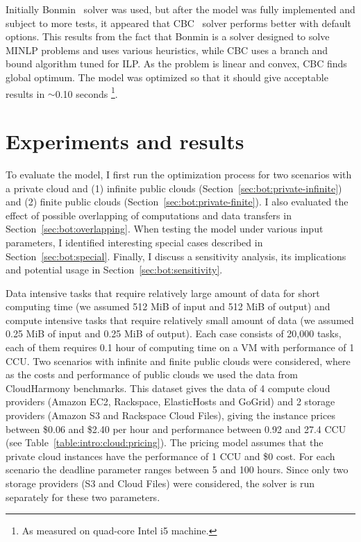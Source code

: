 {  Initially {Bonmin}~\cite{Bonami2008} solver was used, but after the model was fully implemented and subject to more tests, it appeared that CBC~\cite{cbc-solver} solver performs better with default options. This results from the fact that {Bonmin} is a solver designed to solve MINLP problems and uses various heuristics, while CBC uses a branch and bound algorithm tuned for ILP. As the problem is linear and convex, CBC finds global optimum. The model was optimized so that it should give acceptable results in $\sim$0.10 seconds \footnote{As measured on quad-core Intel i5 machine.}. 

\section{Experiments and results}
\label{sec:bot:results}
    
  To evaluate the model, I first run the optimization process for two scenarios with a private cloud and (1) infinite public clouds (Section~\ref{sec:bot:private-infinite}) and (2) finite public clouds (Section~\ref{sec:bot:private-finite}). I also evaluated the effect of possible overlapping of computations and data transfers in Section~\ref{sec:bot:overlapping}. When testing the model under various input parameters, I identified interesting special cases described in Section~\ref{sec:bot:special}. Finally, I discuss a sensitivity analysis, its implications and potential usage in Section~\ref{sec:bot:sensitivity}.
    
  Data intensive tasks that require relatively large amount of data for short computing time (we assumed 512 MiB of input and 512 MiB of output) and compute intensive tasks that require relatively small amount of data (we assumed 0.25 MiB of input and 0.25 MiB of output). Each case consists of 20,000 tasks, each of them requires 0.1 hour of computing time on a VM with performance of 1 CCU. Two scenarios with infinite and finite public clouds were considered, where as the costs and performance of public clouds we used the data from CloudHarmony benchmarks. This dataset gives the data of 4 compute cloud providers (Amazon EC2, Rackspace, ElasticHosts and GoGrid) and 2 storage providers (Amazon S3 and Rackspace Cloud Files), giving the instance prices between \$0.06 and \$2.40 per hour and performance between 0.92 and 27.4 CCU (see Table~\ref{table:intro:cloud:pricing}). The pricing model assumes that the private cloud instances have the performance of 1 CCU and \$0 cost.  For each scenario the deadline parameter ranges between 5 and 100 hours.  Since only two storage providers (S3 and Cloud Files) were considered, the solver is run separately for these two parameters.
    
}
